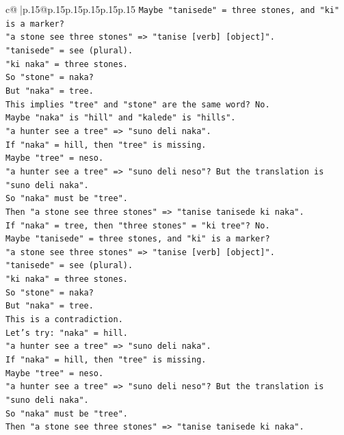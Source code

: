\documentclass{article}
\begin{document}
{\begin{supertabular}{c@{$\;$}|p{.15\linewidth}@{}p{.15\linewidth}p{.15\linewidth}p{.15\linewidth}p{.15\linewidth}p{.15\linewidth}}
{{{\texttt{Maybe "tanisede" = three stones, and "ki" is a marker?} \\
\texttt{"a stone see three stones" => "tanise {[}verb{]} {[}object{]}".} \\
\texttt{"tanisede" = see (plural).} \\
\texttt{"ki naka" = three stones.} \\
\texttt{So "stone" = naka?} \\
\texttt{But "naka" = tree.} \\
\texttt{This implies "tree" and "stone" are the same word? No.} \\
\texttt{Maybe "naka" is "hill" and "kalede" is "hills".} \\
\texttt{"a hunter see a tree" => "suno deli naka".} \\
\texttt{If "naka" = hill, then "tree" is missing.} \\
\texttt{Maybe "tree" = neso.} \\
\texttt{"a hunter see a tree" => "suno deli neso"? But the translation is "suno deli naka".} \\
\texttt{So "naka" must be "tree".} \\
\texttt{Then "a stone see three stones" => "tanise tanisede ki naka".} \\
\texttt{If "naka" = tree, then "three stones" = "ki tree"? No.} \\
\texttt{Maybe "tanisede" = three stones, and "ki" is a marker?} \\
\texttt{"a stone see three stones" => "tanise {[}verb{]} {[}object{]}".} \\
\texttt{"tanisede" = see (plural).} \\
\texttt{"ki naka" = three stones.} \\
\texttt{So "stone" = naka?} \\
\texttt{But "naka" = tree.} \\
\texttt{This is a contradiction.} \\
\texttt{Let's try: "naka" = hill.} \\
\texttt{"a hunter see a tree" => "suno deli naka".} \\
\texttt{If "naka" = hill, then "tree" is missing.} \\
\texttt{Maybe "tree" = neso.} \\
\texttt{"a hunter see a tree" => "suno deli neso"? But the translation is "suno deli naka".} \\
\texttt{So "naka" must be "tree".} \\
\texttt{Then "a stone see three stones" => "tanise tanisede ki naka".} \\
}}}
\end{supertabular}}
\end{document}

